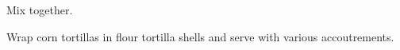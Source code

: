 \begin{recipe}

Mix together.


Wrap corn tortillas in flour tortilla shells and serve with various accoutrements.

\end{recipe}
